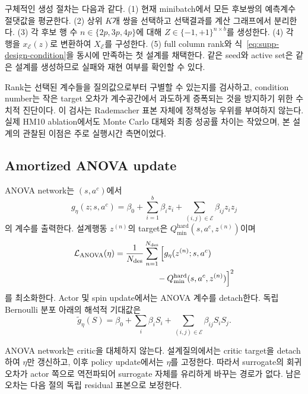 \documentclass[10pt,journal]{IEEEtran}
\begin{document}
구체적인 생성 절차는 다음과 같다. (1) 현재 minibatch에서 모든 후보쌍의 예측계수 절댓값을 평균한다. (2) 상위 $K$개 쌍을 선택하고 선택결과를 계산 그래프에서 분리한다. (3) 각 후보 행 수 $n\in\{2p,3p,4p\}$에 대해 $Z\in\{-1,+1\}^{n\times b}$를 생성한다. (4) 각 행을 $x_{\mathcal E}(z)$로 변환하여 $X_{\mathcal E}$를 구성한다. (5) full column rank와 식~\eqref{eq:supp-design-condition}을 동시에 만족하는 첫 설계를 채택한다. 같은 seed와 active set은 같은 설계를 생성하므로 실패와 재현 여부를 확인할 수 있다.

Rank는 선택된 계수들을 질의값으로부터 구별할 수 있는지를 검사하고, condition number는 작은 target 오차가 계수공간에서 과도하게 증폭되는 것을 방지하기 위한 수치적 진단이다. 이 검사는 Rademacher 표본 자체에 정책성능 우위를 부여하지 않는다. 실제 HM10 ablation에서도 Monte Carlo 대체와 최종 성공률 차이는 작았으며, 본 설계의 관찰된 이점은 주로 실행시간 측면이었다.

\subsection{Amortized ANOVA update}

ANOVA network는 $(s,a^c)$에서
\begin{equation}
g_\eta(z;s,a^c)=\beta_0+
\sum_{i=1}^{b}\beta_i z_i+
\sum_{(i,j)\in\mathcal E}\beta_{ij}z_i z_j
\label{eq:supp-anova}
\end{equation}
의 계수를 출력한다. 설계행동 $z^{(n)}$의 target은
$Q_{\min}^{\mathrm{hard}}(s,a^c,z^{(n)})$이며
\begin{align}
\mathcal L_{\mathrm{ANOVA}}(\eta)
&=\frac1{N_{\mathrm{des}}}\sum_{n=1}^{N_{\mathrm{des}}}
\Big[g_\eta(z^{(n)};s,a^c)
\nonumber\\
&\hspace{18mm}
-Q_{\min}^{\mathrm{hard}}(s,a^c,z^{(n)})\Big]^2
\end{align}
를 최소화한다. Actor 및 spin update에서는 ANOVA 계수를 detach한다. 독립 Bernoulli 분포 아래의 해석적 기대값은
\begin{equation}
\widetilde g_\eta(S)=\beta_0+
\sum_i\beta_iS_i+
\sum_{(i,j)\in\mathcal E}\beta_{ij}S_iS_j.
\label{eq:supp-anova-expectation}
\end{equation}

ANOVA network는 critic을 대체하지 않는다. 설계질의에서는 critic target을 detach하여 $\eta$만 갱신하고, 이후 policy update에서는 $\eta$를 고정한다. 따라서 surrogate의 회귀오차가 actor 쪽으로 역전파되어 surrogate 자체를 유리하게 바꾸는 경로가 없다. 남은 오차는 다음 절의 독립 residual 표본으로 보정한다.
\end{document}
